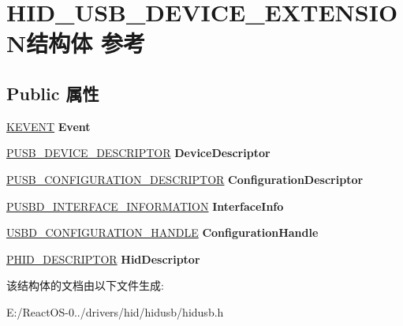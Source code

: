 \hypertarget{struct_h_i_d___u_s_b___d_e_v_i_c_e___e_x_t_e_n_s_i_o_n}{}\section{H\+I\+D\+\_\+\+U\+S\+B\+\_\+\+D\+E\+V\+I\+C\+E\+\_\+\+E\+X\+T\+E\+N\+S\+I\+O\+N结构体 参考}
\label{struct_h_i_d___u_s_b___d_e_v_i_c_e___e_x_t_e_n_s_i_o_n}
\subsection*{Public 属性}
\begin{DoxyCompactItemize}
\item 
\mbox{\label{struct_h_i_d___u_s_b___d_e_v_i_c_e___e_x_t_e_n_s_i_o_n_ac74148646287e68f195c7161fae1d584}} 
\hyperlink{struct___k_e_v_e_n_t}{K\+E\+V\+E\+NT} {\bfseries Event}
\item 
\mbox{\label{struct_h_i_d___u_s_b___d_e_v_i_c_e___e_x_t_e_n_s_i_o_n_a8caea72685880756ffa23a063e3833fc}} 
\hyperlink{struct___u_s_b___d_e_v_i_c_e___d_e_s_c_r_i_p_t_o_r}{P\+U\+S\+B\+\_\+\+D\+E\+V\+I\+C\+E\+\_\+\+D\+E\+S\+C\+R\+I\+P\+T\+OR} {\bfseries Device\+Descriptor}
\item 
\mbox{\label{struct_h_i_d___u_s_b___d_e_v_i_c_e___e_x_t_e_n_s_i_o_n_a5053b5a5b57290fef97a61e439ed7b49}} 
\hyperlink{struct___u_s_b___c_o_n_f_i_g_u_r_a_t_i_o_n___d_e_s_c_r_i_p_t_o_r}{P\+U\+S\+B\+\_\+\+C\+O\+N\+F\+I\+G\+U\+R\+A\+T\+I\+O\+N\+\_\+\+D\+E\+S\+C\+R\+I\+P\+T\+OR} {\bfseries Configuration\+Descriptor}
\item 
\mbox{\label{struct_h_i_d___u_s_b___d_e_v_i_c_e___e_x_t_e_n_s_i_o_n_a76b45a51cef233eb4e9ce42c8c7f56f0}} 
\hyperlink{struct___u_s_b_d___i_n_t_e_r_f_a_c_e___i_n_f_o_r_m_a_t_i_o_n}{P\+U\+S\+B\+D\+\_\+\+I\+N\+T\+E\+R\+F\+A\+C\+E\+\_\+\+I\+N\+F\+O\+R\+M\+A\+T\+I\+ON} {\bfseries Interface\+Info}
\item 
\mbox{\label{struct_h_i_d___u_s_b___d_e_v_i_c_e___e_x_t_e_n_s_i_o_n_a11017cf90f2a73bf45f50bd0c5243d0d}} 
\hyperlink{interfacevoid}{U\+S\+B\+D\+\_\+\+C\+O\+N\+F\+I\+G\+U\+R\+A\+T\+I\+O\+N\+\_\+\+H\+A\+N\+D\+LE} {\bfseries Configuration\+Handle}
\item 
\mbox{\label{struct_h_i_d___u_s_b___d_e_v_i_c_e___e_x_t_e_n_s_i_o_n_a18cad675a30f3906d9900c3553c12f68}} 
\hyperlink{struct___h_i_d___d_e_s_c_r_i_p_t_o_r}{P\+H\+I\+D\+\_\+\+D\+E\+S\+C\+R\+I\+P\+T\+OR} {\bfseries Hid\+Descriptor}
\end{DoxyCompactItemize}


该结构体的文档由以下文件生成\+:\begin{DoxyCompactItemize}
\item 
E\+:/\+React\+O\+S-\/0../drivers/hid/hidusb/hidusb.\+h\end{DoxyCompactItemize}
